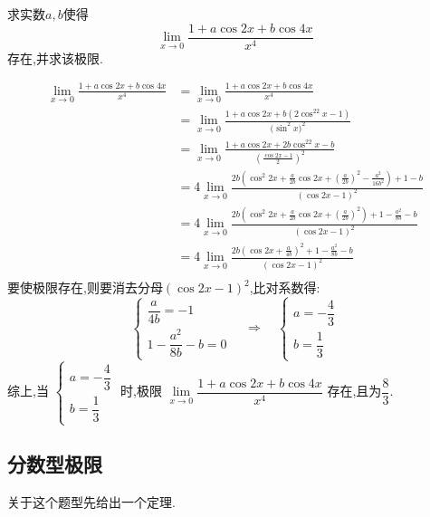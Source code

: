 \examples 求实数$a,b$使得
\[
\lim\limits_{x \to 0}\frac{1+a\cos2x+b\cos4x}{x^4}
\]
存在,并求该极限.

\solve 
\[
\begin{split}
	\lim\limits_{x \to 0}\frac{1+a\cos2x+b\cos4x}{x^4}&=\lim\limits_{x \to 0}\frac{1+a\cos2x+b\cos4x}{x^4}\\
	&=\lim\limits_{x \to 0}\frac{1+a\cos 2x+b(2 \cos^22x-1)}{\big(\sin^2x\big)^2}\\
	&=\lim\limits_{x \to 0}\frac{1+a\cos 2x+2b \cos^22x-b}{\left(\frac{\cos 2x-1}{2}\right)^2}\\
	&=4\lim\limits_{x \to 0}\frac{2b\left(\cos^2 2x+\frac{a}{2b}\cos 2x +\left( \frac{a}{2b}\right)^2 -\frac{a^2}{16b^2}  \right)+1-b }{\left(\cos 2x-1\right)^2}\\
	&=4\lim\limits_{x \to 0}\frac{2b\left(\cos^2 2x+\frac{a}{2b}\cos 2x +\left( \frac{a}{2b}\right)^2 \right)+1-\frac{a^2}{8b} -b }{\left(\cos 2x-1\right)^2}\\
	&=4\lim\limits_{x \to 0}\frac{2b\left(\cos 2x +\frac{a}{4b}\right)^2+1-\frac{a^2}{8b} -b }{\left(\cos 2x-1\right)^2}\\
\end{split}
\]
要使极限存在,则要消去分母$\left(\cos 2x-1\right)^2$,比对系数得:
\[
\begin{cases}
	\dfrac{a}{4b}=-1\\[0.5em]
	1-\dfrac{a^2}{8b}-b=0
\end{cases}
\quad 
\Rightarrow
\quad 
\begin{cases}
	a=-\dfrac{4}{3}\\[0.5em]
	b=\dfrac{1}{3}
\end{cases}
\]
综上,当
$
\begin{cases}
	a=-\dfrac{4}{3}\\[0.5em]
	b=\dfrac{1}{3}
\end{cases}
$
时,极限
$
\lim\limits_{x \to 0}\dfrac{1+a\cos2x+b\cos4x}{x^4}
$
存在,且为$\dfrac{8}{3}.$

\subsection{分数型极限}

\texample[分数型极限]
关于这个题型先给出一个定理.

